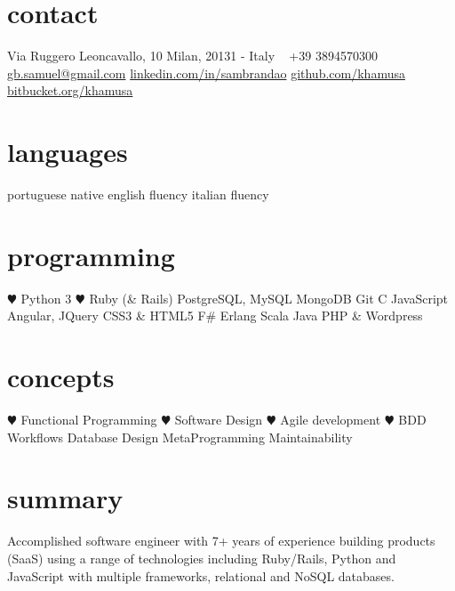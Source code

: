 \documentclass[]{friggeri-cv} %
\begin{document}


\begin{aside} %
\section{contact}
Via Ruggero 
Leoncavallo, 10
Milan, 20131 - Italy
~
+39 3894570300
~
\href{mailto:gb.samuel@gmail.com}{gb.samuel@gmail.com}
\href{http://it.linkedin.com/in/sambrandao}{linkedin.com/in/sambrandao}
\href{http://github.com/khamusa}{github.com/khamusa}
\href{http://bitbucket.org/khamusa}{bitbucket.org/khamusa}
\section{languages}
portuguese native
english fluency
italian fluency
\section{programming}
{\color{red} $\varheartsuit$} Python 3
{\color{red} $\varheartsuit$} Ruby (\& Rails)
PostgreSQL, MySQL
MongoDB
Git
C
JavaScript
Angular, JQuery
CSS3 \& HTML5
F\#
Erlang
Scala
Java
PHP \& Wordpress
\section{concepts}
{\color{red} $\varheartsuit$} Functional Programming
{\color{red} $\varheartsuit$} Software Design
{\color{red} $\varheartsuit$} Agile development
{\color{red} $\varheartsuit$} BDD Workflows
Database Design
MetaProgramming
Maintainability
\end{aside}


\section{summary}
Accomplished software engineer with 7+ years of experience building products (SaaS) 
using a range of technologies including Ruby/Rails, Python and JavaScript with multiple frameworks, relational and NoSQL databases.
\end{document}
